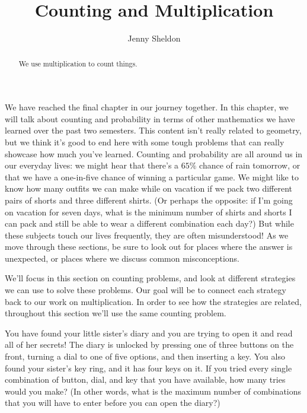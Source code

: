 \documentclass{ximera}
\title{Counting and Multiplication}
\author{Jenny Sheldon}
\begin{document}
\begin{abstract}
We use multiplication to count things.
\end{abstract}
\maketitle

We have reached the final chapter in our journey together. In this chapter, we will talk about counting and probability in terms of other mathematics we have learned over the past two semesters. This content isn't really related to geometry, but we think it's good to end here with some tough problems that can really showcase how much you've learned. Counting and probability are all around us in our everyday lives: we might hear that there's a $65\%$ chance of rain tomorrow, or that we have a one-in-five chance of winning a particular game. We might like to know how many outfits we can make while on vacation if we pack two different pairs of shorts and three different shirts. (Or perhaps the opposite: if I'm going on vacation for seven days, what is the minimum number of shirts and shorts I can pack and still be able to wear a different combination each day?) But while these subjects touch our lives frequently, they are often misunderstood! As we move through these sections, be sure to look out for places where the answer is unexpected, or places where we discuss common misconceptions.

We'll focus in this section on counting problems, and look at different strategies we can use to solve these problems. Our goal will be to connect each strategy back to our work on multiplication. In order to see how the strategies are related, throughout this section we'll use the same counting problem.
\begin{example}
You have found your little sister's diary and you are trying to open it and read all of her secrets! The diary is unlocked by pressing one of three buttons on the front, turning a dial to one of five options, and then inserting a key. You also found your sister's key ring, and it has four keys on it. If you tried every single combination of button, dial, and key that you have available, how many tries would you make? (In other words, what is the maximum number of combinations that you will have to enter before you can open the diary?)
\end{example}
\end{document}
